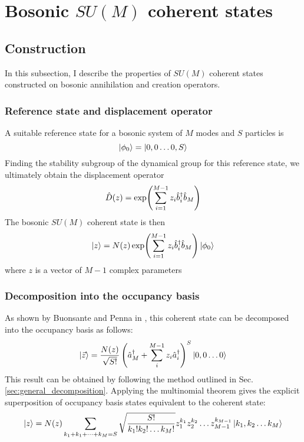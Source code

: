 \section{Bosonic $SU(M)$ coherent states}
	
\subsection{Construction}
In this subsection, I describe the properties of $SU(M)$ coherent states constructed on bosonic annihilation and creation operators.

\subsubsection{Reference state and displacement operator}
A suitable reference state for a bosonic system of $M$ modes and $S$ particles is
\begin{equation}
\ket{\phi_0}=\ket{0,0\dots 0, S}
\end{equation}
Finding the stability subgroup of the dynamical group for this reference state, we ultimately obtain the displacement operator
\begin{equation}
\hat{D}(z)=\exp(\sum_{i=1}^{M-1}z_i\hat{b}^\dagger_i\hat{b}_M)
\end{equation}
The bosonic $SU(M)$ coherent state is then
\begin{equation}
\ket{z}=N(z)\exp(\sum_{i=1}^{M-1}z_i\hat{b}^\dagger_i\hat{b}_M)\ket{\phi_0}
\end{equation}
where $z$ is a vector of $M-1$ complex parameters

\subsubsection{Decomposition into the occupancy basis}
As shown by Buonsante and Penna in \cite{buonsante}, this coherent state can be decomposed into the occupancy basis as follows:
\begin{equation} \label{eq:bosonic_decomposition}
\ket{\vec{z}}=\frac{N(z)}{\sqrt{S!}}\left(\hat{a}^\dagger_M+\sum_i^{M-1}z_i\hat{a}^\dagger_i\right)^S\ket{0,0\dots 0}
\end{equation}
This result can be obtained by following the method outlined in Sec. \ref{sec:general_decomposition}. Applying the multinomial theorem gives the explicit superposition of occupancy basis states equivalent to the coherent state:
\begin{equation}
\ket{z}=N(z)\sum_{k_1+k_1+\dots +k_M=S}\sqrt{\frac{S!}{k_1!k_2!\dots k_M!}}z_1^{k_1}z_2^{k_2}\dots z_{M-1}^{k_{M-1}}\ket{k_1,k_2\dots k_M}
\end{equation}

